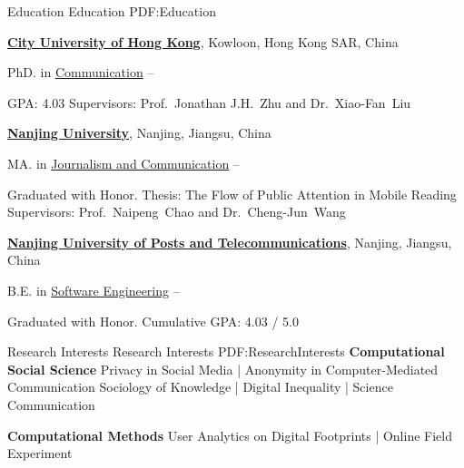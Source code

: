 \documentclass[letterpaper,MMMyyyy,nonstopmode]{CV}
\begin{document}
\begin{Body}


\Section
{Education}
{Education}
{PDF:Education}

\BigGap
\Entry
\href{http://www.cityu.edu.hk/}
{\textbf{City University of Hong Kong}},
Kowloon, Hong Kong SAR, China

\Gap
\BulletItem
PhD. in
\href{http://www.cityu.edu.hk/com/}
{Communication}
\hfill
{} --
\begin{Detail}
\SubBulletItem
GPA:
{4.03}
\SubBulletItem
Supervisors:
Prof.~Jonathan J.H.~Zhu and
Dr.~Xiao-Fan~Liu
\end{Detail}

\href{http://www.nju.edu.cn/}
{\textbf{Nanjing University}},
Nanjing, Jiangsu, China

\Gap
\BulletItem
MA. in
\href{http://jc.nju.edu.cn/}
{Journalism and Communication}
\hfill
{} --
\begin{Detail}
\SubBulletItem
Graduated with Honor.
\SubBulletItem
Thesis:
{The Flow of Public Attention in Mobile Reading}
\SubBulletItem
Supervisors:
Prof.~Naipeng~Chao and
Dr.~Cheng-Jun~Wang
\end{Detail}

\href{http://www.njupt.edu.cn/}
{\textbf{Nanjing University of Posts and Telecommunications}},
Nanjing, Jiangsu, China

\Gap
\BulletItem
B.E. in
\href{http://cs.njupt.edu.cn/}
{Software Engineering}
\hfill
{} --
\begin{Detail}
\SubBulletItem
Graduated with Honor.
\SubBulletItem
Cumulative GPA: 4.03 / 5.0
\end{Detail}

\Section
{Research Interests}
{Research Interests}
{PDF:ResearchInterests}
\textbf{Computational Social Science}
\Gap
\BulletItem
Privacy in Social Media | Anonymity in Computer-Mediated Communication
\Gap
\BulletItem
Sociology of Knowledge | Digital Inequality | Science Communication

\textbf{Computational Methods}
\Gap
\BulletItem
User Analytics on Digital Footprints | Online Field Experiment



\end{Body}
\end{document}

